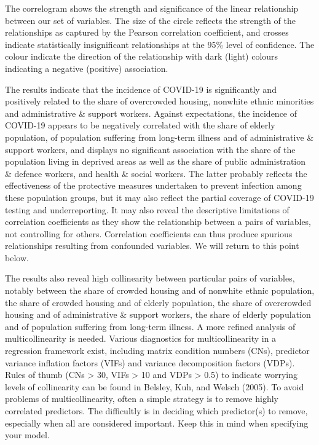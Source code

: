 \documentclass[
  letterpaper,
  DIV=11,
  numbers=noendperiod,
  oneside]{scrreprt}
\begin{document}
The correlogram shows the strength and significance of the linear
relationship between our set of variables. The size of the circle
reflects the strength of the relationships as captured by the Pearson
correlation coefficient, and crosses indicate statistically
insignificant relationships at the 95\% level of confidence. The colour
indicate the direction of the relationship with dark (light) colours
indicating a negative (positive) association.

The results indicate that the incidence of COVID-19 is significantly and
positively related to the share of overcrowded housing, nonwhite ethnic
minorities and administrative \& support workers. Against expectations,
the incidence of COVID-19 appears to be negatively correlated with the
share of elderly population, of population suffering from long-term
illness and of administrative \& support workers, and displays no
significant association with the share of the population living in
deprived areas as well as the share of public administration \& defence
workers, and health \& social workers. The latter probably reflects the
effectiveness of the protective measures undertaken to prevent infection
among these population groups, but it may also reflect the partial
coverage of COVID-19 testing and underreporting. It may also reveal the
descriptive limitations of correlation coefficients as they show the
relationship between a pairs of variables, not controlling for others.
Correlation coefficients can thus produce spurious relationships
resulting from confounded variables. We will return to this point below.

The results also reveal high collinearity between particular pairs of
variables, notably between the share of crowded housing and of nonwhite
ethnic population, the share of crowded housing and of elderly
population, the share of overcrowded housing and of administrative \&
support workers, the share of elderly population and of population
suffering from long-term illness. A more refined analysis of
multicollinearity is needed. Various diagnostics for multicollinearity
in a regression framework exist, including matrix condition numbers
(CNs), predictor variance inflation factors (VIFs) and variance
decomposition factors (VDPs). Rules of thumb (CNs \textgreater{} 30,
VIFs \textgreater{} 10 and VDPs \textgreater{} 0.5) to indicate worrying
levels of collinearity can be found in Belsley, Kuh, and Welsch (2005).
To avoid problems of multicollinearity, often a simple strategy is to
remove highly correlated predictors. The difficultly is in deciding
which predictor(s) to remove, especially when all are considered
important. Keep this in mind when specifying your model.
\end{document}
